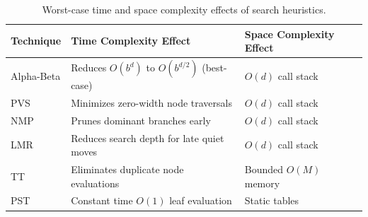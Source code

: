 \begin{table}[htbp]
\centering
\caption[Complexity Comparison of Search Heuristics]{Worst-case time and space complexity effects of search heuristics.}
\label{tab:search_complexity}
\begin{tabularx}{\textwidth}{lXX}
\toprule
\textbf{Technique} & \textbf{Time Complexity Effect} & \textbf{Space Complexity Effect} \\
\midrule
Alpha-Beta & Reduces $O(b^d)$ to $O(b^{d/2})$ (best-case) & $O(d)$ call stack \\
PVS & Minimizes zero-width node traversals & $O(d)$ call stack \\
NMP & Prunes dominant branches early & $O(d)$ call stack \\
LMR & Reduces search depth for late quiet moves & $O(d)$ call stack \\
TT & Eliminates duplicate node evaluations & Bounded $O(M)$ memory \\
PST & Constant time $O(1)$ leaf evaluation & Static tables \\
\bottomrule
\end{tabularx}
\end{table}

